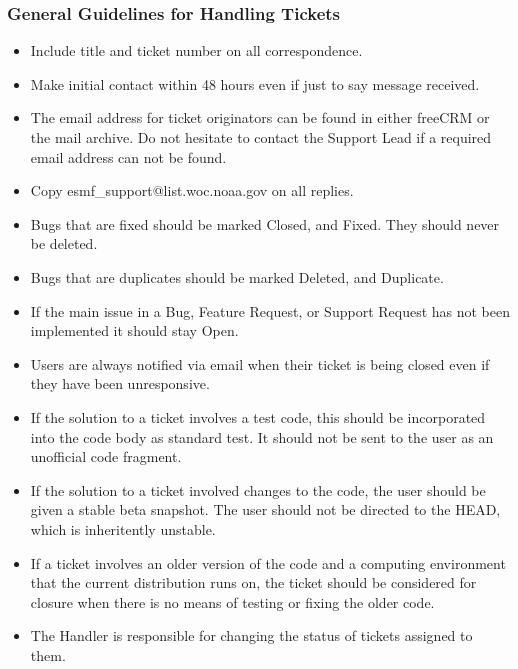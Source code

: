 \subsubsection{General Guidelines for Handling Tickets}
\begin{itemize}
\item Include title and ticket number on all correspondence.
\item Make initial contact within 48 hours even if just to say message received.
\item The email address for ticket originators can be found in either freeCRM or the mail archive. Do not hesitate to contact the Support Lead if a required email address can not be found. 
\item Copy esmf\_support@list.woc.noaa.gov on all replies.
\item Bugs that are fixed should be marked Closed, and Fixed. They should never be deleted. 
\item Bugs that are duplicates should be marked Deleted, and Duplicate. 
\item If the main issue in a Bug, Feature Request, or Support Request has not been implemented it should stay Open.
\item Users are always notified via email when their ticket is being closed even if they have been unresponsive.  
\item If the solution to a ticket involves a test code, this should be incorporated into the code body as standard test. It should not be sent to the user as an unofficial code fragment. 
\item If the solution to a ticket involved changes to the code, the user should be given a stable beta snapshot. The user should not be directed to the HEAD, which is inheritently unstable.  
\item If a ticket involves an older version of the code and a computing environment that the current distribution runs on, the ticket should be considered for closure when there is no means of testing or fixing the older code. 
\item The Handler is responsible for changing the status of tickets assigned to them.  
\end{itemize}

